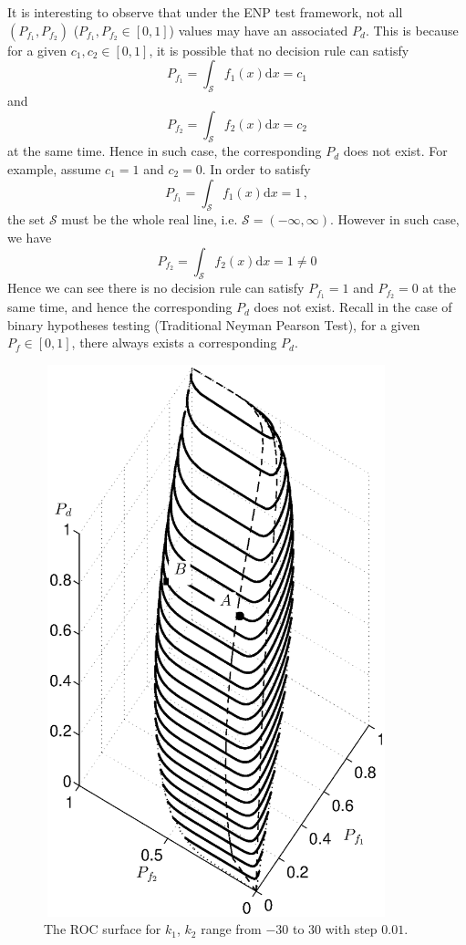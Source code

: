 It is interesting to observe that under the ENP test framework, not all $(P_{f_1}, P_{f_2})$  ($P_{f_1}, P_{f_2}\in [0, 1]$) values may have an associated $P_d$. This is because for a given $c_1, c_2 \in [0, 1]$, it is possible that no decision rule can satisfy
\[
  P_{f_1} = \int_{\mathcal{S}}f_1(x)\mathrm{d}x =  c_1
\]
and
\[
  P_{f_2} = \int_{\mathcal{S}}f_2(x)\mathrm{d}x = c_2
\]
at the same time. Hence in such case, the corresponding $P_d$ does not exist. 
For example, assume $c_1 = 1$ and $c_2 = 0$. In order to satisfy 
\[
  P_{f_1} = \int_{\mathcal{S}}f_1(x)\mathrm{d}x = 1\,,
\]
the set $\mathcal{S}$  must  be the whole real line, i.e. $\mathcal{S} = (-\infty, \infty)$. However in such case, we have
\[
  P_{f_2} = \int_{\mathcal{S}}f_2(x)\mathrm{d}x = 1 \neq 0
\]
Hence we can see there is no decision rule can satisfy $P_{f_1} = 1$ and $P_{f_2} = 0$ at the same time, and hence the corresponding $P_d$ does not exist.
Recall in the case of binary hypotheses testing (Traditional Neyman Pearson Test), for a given $P_f \in [0, 1]$, there always exists a corresponding $P_d$. 

\begin{figure}[!t]
\centering
\includegraphics[width = 10cm, height=16cm]{2/ex1.eps}
\caption{The ROC surface for $k_1$, $k_2$ range from $-30$ to $30$ with step $0.01$.}
\label{fig: 2.1}
\end{figure}

